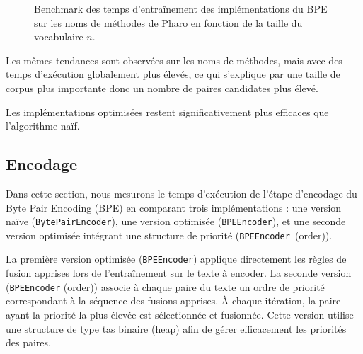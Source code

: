 \documentclass[12pt,a4paper]{report}
\begin{document}
\begin{figure}[h]
	\caption{Benchmark des temps d'entraînement des implémentations du BPE sur les noms de méthodes de Pharo en fonction de la taille du vocabulaire $n$.}
	\label{fig:bench8}
\end{figure}
\FloatBarrier

Les mêmes tendances sont observées sur les noms de méthodes, mais avec des temps d’exécution globalement plus élevés, ce qui s’explique par une taille de corpus plus importante donc un nombre de paires candidates plus élevé.

Les implémentations optimisées restent significativement plus efficaces que l’algorithme naïf.

	\subsection{Encodage}
	
	Dans cette section, nous mesurons le temps d’exécution de l’étape d’encodage du Byte Pair Encoding (BPE) en comparant trois implémentations : une version naïve (\texttt{BytePairEncoder}), une version optimisée (\texttt{BPEEncoder}), et une seconde version optimisée intégrant une structure de priorité (\texttt{BPEEncoder }(order)).
	
	La première version optimisée (\texttt{BPEEncoder}) applique directement les règles de fusion apprises lors de l’entraînement sur le texte à encoder. La seconde version (\texttt{BPEEncoder} (order)) associe à chaque paire du texte un ordre de priorité correspondant à la séquence des fusions apprises. À chaque itération, la paire ayant la priorité la plus élevée est sélectionnée et fusionnée. Cette version utilise une structure de type tas binaire (heap) afin de gérer efficacement les priorités des paires.
	
\end{document}

